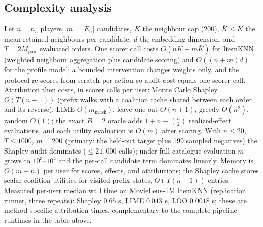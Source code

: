 \subsection*{Complexity analysis}
Let $n=n_u$ players, $m=|E_u|$ candidates, $K$ the neighbour cap ($200$), $\bar K\le K$ the mean retained neighbours per candidate, $d$ the embedding dimension, and $T=2M_{\mathrm{pair}}$ evaluated orders. One scorer call costs $O(nK+m\bar K)$ for ItemKNN (weighted neighbour aggregation plus candidate scoring) and $O((n+m)d)$ for the profile model; a bounded intervention changes weights only, and the protocol re-scores from scratch per action so audit cost equals one scorer call. Attribution then costs, in scorer calls per user: Monte Carlo Shapley $O(T(n+1))$ (prefix walks with a coalition cache shared between each order and its reverse), LIME $O(m_{\mathrm{mask}})$, leave-one-out $O(n+1)$, greedy $O(n^2)$, random $O(1)$; the exact $B=2$ oracle adds $1+n+\binom n2$ realized-effect evaluations, and each utility evaluation is $O(m)$ after scoring. With $n\le20$, $T\le1000$, $m=200$ (primary: the held-out target plus 199 sampled negatives) the Shapley audit dominates ($\le21{,}000$ calls); under full-catalogue evaluation $m$ grows to $10^3$--$10^4$ and the per-call candidate term dominates linearly. Memory is $O(m+n)$ per user for scores, effects, and attributions; the Shapley cache stores scalar coalition utilities for visited prefix states, $O(T(n+1))$ entries. Measured per-user median wall time on MovieLens-1M ItemKNN (replication runner, three repeats): Shapley $0.65$ s, LIME $0.043$ s, LOO $0.0018$ s; these are method-specific attribution times, complementary to the complete-pipeline runtimes in the table above.